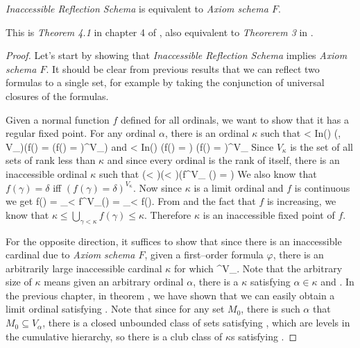 \begin{theorem}
\emph{Inaccessible Reflection Schema} is equivalent to \emph{Axiom schema $F$}.
\end{theorem}

This is \emph{Theorem 4.1} in chapter 4 of \cite{DrakeBook}, also equivalent to \emph{Theorerem 3} in \cite{Levy60a}.

\begin{proof} 
Let's start by showing that \emph{Inaccessible Reflection Schema} implies \emph{Axiom schema $F$}. 
It should be clear from previous results that we can reflect two formulas to a single set, for example by taking the conjunction of universal closures of the formulas.

Given a normal function $f$ defined for all ordinals, we want to show that it has a regular fixed point. 
For any ordinal $\alpha$, there is an ordinal $\kappa$ such that 
\beq
\alpha < \kappa \et In(\kappa) \et (\forall \gamma, \delta \in V_\kappa)(f(\gamma) = \delta \iff (f(\gamma) = \delta)^{V_\kappa})
\eeq
and
\beq
\alpha < \kappa \et In(\kappa) \et \forall \gamma \exists \delta (f(\gamma) = \delta) \iff (\forall \gamma \exists \delta f(\gamma) = \delta)^{V_\kappa}
\eeq
Since $V_\kappa$ is the set of all sets of rank less than $\kappa$ and since every ordinal is the rank of itself, there is an inaccessible ordinal $\kappa$ such that
\beq
(\forall \gamma < \kappa)(\exists \delta < \kappa)(f^{V_\kappa} (\gamma) = \delta)\label{eq:reflected_function}
\eeq
We also know that $f(\gamma) = \delta$ iff $(f(\gamma) = \delta)^{V_\kappa}$. 
Now since $\kappa$ is a limit ordinal and $f$ is continuous we get
\beq
f(\kappa) = \bigcup_{\gamma < \kappa} f^{V_\kappa}(\gamma) = \bigcup_{\gamma < \kappa} f(\gamma)\mbox{.}
\eeq
From  and the fact that $f$ is increasing, we know that $\kappa \leq \bigcup_{\gamma < \kappa} f(\gamma) \leq \kappa$. Therefore $\kappa$ is an inaccessible fixed point of $f$.

For the opposite direction, it suffices to show that since there is an inaccessible cardinal due to \emph{Axiom schema $F$}, given a first–order formula $\varphi$, there is an arbitrarily large inaccessible cardinal $\kappa$ for which 
\beq
\varphi \iff \varphi^{V_\kappa}\mbox{.}\label{eq:ch3_f_iff_m_1}
\eeq
Note that the arbitrary size of $\kappa$ means given an arbitrary ordinal $\alpha$, there is a $\kappa$ satisfying $\alpha \in \kappa$ and .
In the previous chapter, in theorem , we have shown that we can easily obtain a limit ordinal satisfying . Note that since for any set $M_0$, there is such $\alpha$ that $M_0 \subseteq V_\alpha$, there is a closed unbounded class of sets satisfying , which are levels in the cumulative hierarchy, so there is a club class of $\kappa$s satisfying .


\end{proof}
